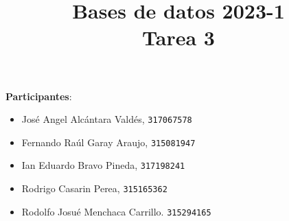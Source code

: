 \documentclass[12pt,letterpaper]{article}
\title{Bases de datos 2023-1\\
Tarea 3}
\begin{document}
\maketitle

\textbf{Participantes}:
\begin{itemize}
	\item José Angel Alcántara Valdés, \texttt{317067578}\\
	\item Fernando Raúl Garay Araujo, \texttt{315081947}\\
	\item Ian Eduardo Bravo Pineda, \texttt{317198241}\\
	\item Rodrigo Casarin Perea, \texttt{315165362}\\
	\item Rodolfo Josué Menchaca Carrillo. \texttt{315294165}\\
\end{itemize}
\end{document}
